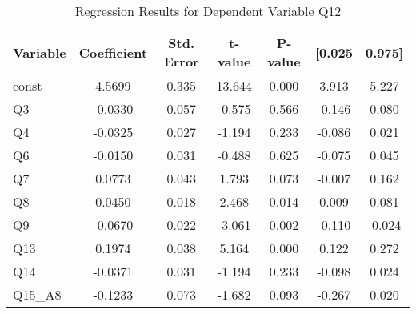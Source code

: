 \begin{table}[H]
  \centering
  \caption{Regression Results for Dependent Variable Q12}\label{tab:regression_q12}
  \begin{tabular}{lcccccc}
    \toprule
    \textbf{Variable} & \textbf{Coefficient} & \textbf{Std. Error} & \textbf{t-value} & \textbf{P-value} & \textbf{[0.025} & \textbf{0.975]} \\
    \midrule
    const   & 4.5699 & 0.335 & 13.644 & 0.000 & 3.913 & 5.227 \\
    Q3      & -0.0330 & 0.057 & -0.575 & 0.566 & -0.146 & 0.080 \\
    Q4      & -0.0325 & 0.027 & -1.194 & 0.233 & -0.086 & 0.021 \\
    Q6      & -0.0150 & 0.031 & -0.488 & 0.625 & -0.075 & 0.045 \\
    Q7      & 0.0773 & 0.043 & 1.793 & 0.073 & -0.007 & 0.162 \\
    Q8      & 0.0450 & 0.018 & 2.468 & 0.014 & 0.009 & 0.081 \\
    Q9      & -0.0670 & 0.022 & -3.061 & 0.002 & -0.110 & -0.024 \\
    Q13     & 0.1974 & 0.038 & 5.164 & 0.000 & 0.122 & 0.272 \\
    Q14     & -0.0371 & 0.031 & -1.194 & 0.233 & -0.098 & 0.024 \\
    Q15\_A8 & -0.1233 & 0.073 & -1.682 & 0.093 & -0.267 & 0.020 \\
    \bottomrule
  \end{tabular}
\end{table}